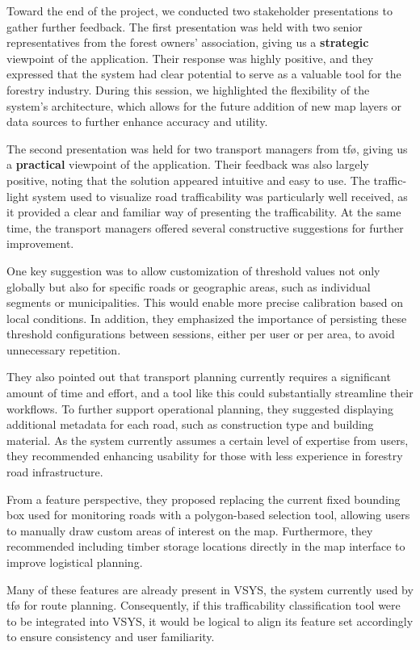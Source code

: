 Toward the end of the project, we conducted two stakeholder presentations to gather further feedback. The first presentation was held with two senior representatives from the forest owners' association, giving us a \textbf{strategic} viewpoint of the application. Their response was highly positive, and they expressed that the system had clear potential to serve as a valuable tool for the forestry industry. During this session, we highlighted the flexibility of the system's architecture, which allows for the future addition of new map layers or data sources to further enhance accuracy and utility.

The second presentation was held for two transport managers from \acrfull{tfø}, giving us a \textbf{practical} viewpoint of the application. Their feedback was also largely positive, noting that the solution appeared intuitive and easy to use. The traffic-light system used to visualize road trafficability was particularly well received, as it provided a clear and familiar way of presenting the trafficability. At the same time, the transport managers offered several constructive suggestions for further improvement.

One key suggestion was to allow customization of threshold values not only globally but also for specific roads or geographic areas, such as individual segments or municipalities. This would enable more precise calibration based on local conditions. In addition, they emphasized the importance of persisting these threshold configurations between sessions, either per user or per area, to avoid unnecessary repetition.

They also pointed out that transport planning currently requires a significant amount of time and effort, and a tool like this could substantially streamline their workflows. To further support operational planning, they suggested displaying additional metadata for each road, such as construction type and building material. As the system currently assumes a certain level of expertise from users, they recommended enhancing usability for those with less experience in forestry road infrastructure.

From a feature perspective, they proposed replacing the current fixed bounding box used for monitoring roads with a polygon-based selection tool, allowing users to manually draw custom areas of interest on the map. Furthermore, they recommended including timber storage locations directly in the map interface to improve logistical planning.

Many of these features are already present in VSYS, the system currently used by \acrshort{tfø} for route planning. Consequently, if this trafficability classification tool were to be integrated into VSYS, it would be logical to align its feature set accordingly to ensure consistency and user familiarity.
